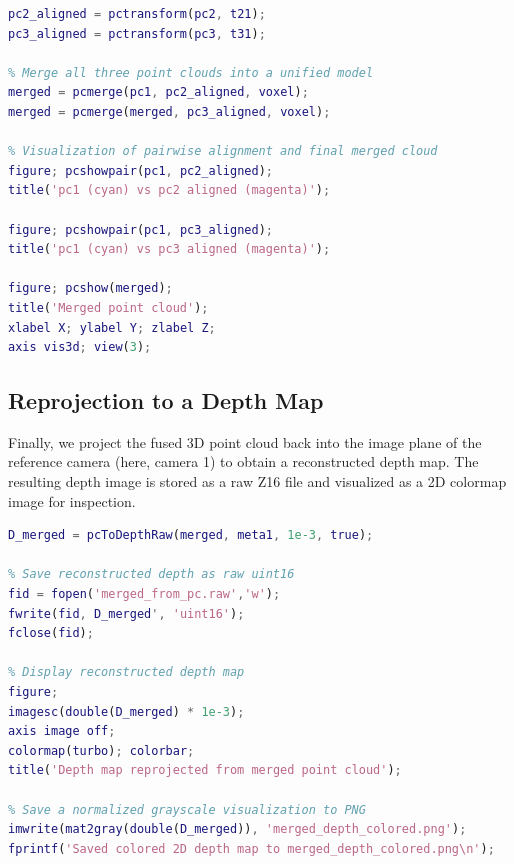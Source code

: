\documentclass[10pt]{article}
\begin{document}
\begin{lstlisting}[language=Matlab,caption={Applying transforms and merging full-resolution clouds}]
% Apply ICP transforms to the original point clouds
pc2_aligned = pctransform(pc2, t21);
pc3_aligned = pctransform(pc3, t31);

% Merge all three point clouds into a unified model
merged = pcmerge(pc1, pc2_aligned, voxel);
merged = pcmerge(merged, pc3_aligned, voxel);

% Visualization of pairwise alignment and final merged cloud
figure; pcshowpair(pc1, pc2_aligned);
title('pc1 (cyan) vs pc2 aligned (magenta)');

figure; pcshowpair(pc1, pc3_aligned);
title('pc1 (cyan) vs pc3 aligned (magenta)');

figure; pcshow(merged);
title('Merged point cloud');
xlabel X; ylabel Y; zlabel Z;
axis vis3d; view(3);
\end{lstlisting}

\subsection{Reprojection to a Depth Map}

Finally, we project the fused 3D point cloud back into the image plane of the
reference camera (here, camera 1) to obtain a reconstructed depth map. The
resulting depth image is stored as a raw Z16 file and visualized as a 2D
colormap image for inspection.

\begin{lstlisting}[language=Matlab,caption={Reprojecting the merged point cloud to a depth map}]
% Reproject merged point cloud back to the reference camera's depth map
D_merged = pcToDepthRaw(merged, meta1, 1e-3, true);

% Save reconstructed depth as raw uint16
fid = fopen('merged_from_pc.raw','w');
fwrite(fid, D_merged', 'uint16');
fclose(fid);

% Display reconstructed depth map
figure;
imagesc(double(D_merged) * 1e-3);
axis image off;
colormap(turbo); colorbar;
title('Depth map reprojected from merged point cloud');

% Save a normalized grayscale visualization to PNG
imwrite(mat2gray(double(D_merged)), 'merged_depth_colored.png');
fprintf('Saved colored 2D depth map to merged_depth_colored.png\n');
\end{lstlisting}
\end{document}
